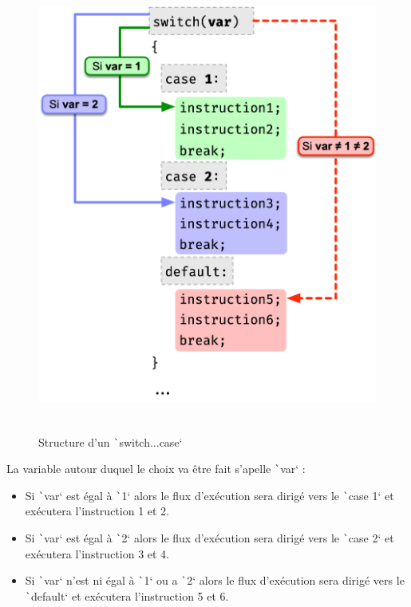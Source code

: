 \documentclass[10pt]{article}
\begin{document}
\smallskip
\begin{multicols}{2}
\begin{figure}[H]
    \includegraphics[max height=15cm,max width = \textwidth/2]{assets/switchCase.jpg}
    \centering
    \caption{Structure d'un \texttt`switch...case`}
\end{figure}

La variable autour duquel le choix va être fait s'apelle \texttt`var` :
\begin{itemize}
    \item Si \texttt`var` est égal à \texttt`1` alors le flux d'exécution sera dirigé vers le \texttt`case 1` et exécutera l'instruction 1 et 2.
    \item Si \texttt`var` est égal à \texttt`2` alors le flux d'exécution sera dirigé vers le \texttt`case 2` et exécutera l'instruction 3 et 4.
    \item Si \texttt`var` n'est ni égal à \texttt`1` ou a  \texttt`2` alors le flux d'exécution sera dirigé vers le \texttt`default` et exécutera l'instruction 5 et 6.
\end{itemize}
\end{multicols}
\end{document}

